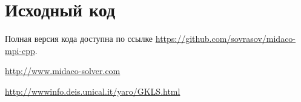 \documentclass[a4paper]{article}
\begin{document}
\section{Исходный код}
\label{sec:source}
Полная версия кода доступна по ссылке \url{https://github.com/sovrasov/midaco-mpi-cpp}.


\begin{thebibliography}{}

\url{http://www.midaco-solver.com}

\url{http://wwwinfo.deis.unical.it/yaro/GKLS.html}

\end{thebibliography}
\end{document}
